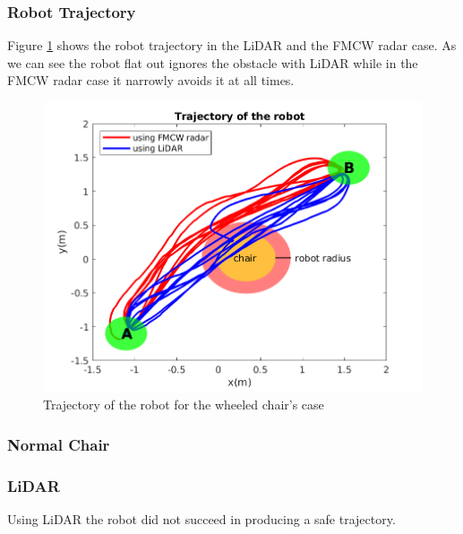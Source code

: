 \subsubsection*{Robot Trajectory}
Figure \ref{fig:traj1} shows the robot trajectory in the \ac{LiDAR} and the \ac{FMCW} radar case. As we can see the robot flat out ignores the obstacle with \ac{LiDAR} while in the \ac{FMCW} \ac{radar} case it narrowly avoids it at all times.
\begin{figure}[ht!]
\centerline{\includegraphics [width=0.7 \textwidth]{imgs/chapter5/traj1.png}}
\caption{Trajectory of the robot for the wheeled chair's case}
\label{fig:traj1}
\end{figure}


\subsubsection{Normal Chair}
\subsubsection*{LiDAR}
Using \ac{LiDAR} the robot did not succeed in producing a safe trajectory.

